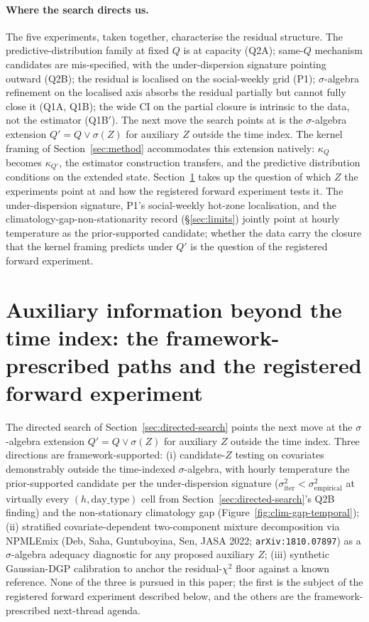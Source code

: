 \paragraph{Where the search directs us.} The five experiments,
taken together, characterise the residual structure. The
predictive-distribution family at fixed $Q$ is at capacity (Q2A);
same-$Q$ mechanism candidates are mis-specified, with the
under-dispersion signature pointing outward (Q2B); the residual
is localised on the social-weekly grid (P1); $\sigma$-algebra
refinement on the localised axis absorbs the residual partially
but cannot fully close it (Q1A, Q1B); the wide CI on the partial
closure is intrinsic to the data, not the estimator (Q1B$'$).
The next move the search points at is the $\sigma$-algebra
extension $Q' = Q \vee \sigma(Z)$ for auxiliary $Z$ outside the
time index. The kernel framing of Section~\ref{sec:method}
accommodates this extension natively: $\kappa_Q$ becomes
$\kappa_{Q'}$, the estimator construction transfers, and the
predictive distribution conditions on the extended state.
Section~\ref{sec:auxiliary} takes up the question of which $Z$
the experiments point at and how the registered forward
experiment tests it. The under-dispersion signature, P1's
social-weekly hot-zone localisation, and the
climatology-gap-non-stationarity record (\S\ref{sec:limits})
jointly point at hourly temperature as the prior-supported
candidate; whether the data carry the closure that the kernel
framing predicts under $Q'$ is the question of the registered
forward experiment.

\section{Auxiliary information beyond the time index: the
framework-prescribed paths and the registered forward experiment}
\label{sec:auxiliary}

The directed search of Section~\ref{sec:directed-search} points
the next move at the $\sigma$-algebra extension
$Q' = Q \vee \sigma(Z)$ for auxiliary $Z$ outside the time index.
Three directions are framework-supported: (i) candidate-$Z$
testing on covariates demonstrably outside the time-indexed
$\sigma$-algebra, with hourly temperature the prior-supported
candidate per the under-dispersion signature
($\sigma^{2}_{\mathrm{iter}} < \sigma^{2}_{\mathrm{empirical}}$
at virtually every $(h, \mathrm{day\_type})$ cell from
Section~\ref{sec:directed-search}'s Q2B finding) and the
non-stationary climatology gap (Figure~\ref{fig:clim-gap-temporal});
(ii) stratified covariate-dependent two-component mixture
decomposition via NPMLEmix (Deb, Saha, Guntuboyina, Sen, JASA
2022; \texttt{arXiv:1810.07897}) as a $\sigma$-algebra adequacy
diagnostic for any proposed auxiliary $Z$; (iii) synthetic
Gaussian-DGP calibration to anchor the residual-$\chi^2$ floor
against a known reference. None of the three is pursued in this
paper; the first is the subject of the registered forward
experiment described below, and the others are the framework-
prescribed next-thread agenda.

